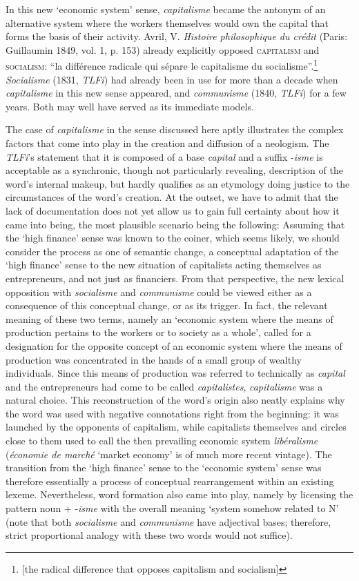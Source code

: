 \documentclass[output=paper]{langsci/langscibook}
\begin{document}
In this new `economic system' sense, \emph{capitalisme} became the
antonym of an alternative system where the workers themselves would own
the capital that forms the basis of their activity. Avril, V.
\emph{Histoire philosophique du crédit} (Paris: Guillaumin 1849, vol.
1, p. 153) already explicitly opposed \textsc{capitalism} and
\textsc{socialism}: ``la différence radicale qui sépare le capitalisme du
socialisme''.\footnote{{[}the radical difference that opposes capitalism
  and socialism{]}} \emph{Socialisme} (1831, \emph{TLFi}) had already
been in use for more than a decade when \emph{capitalisme} in this new
sense appeared, and \emph{communisme} (1840, \emph{TLFi}) for a few
years. Both may well have served as its immediate models.

The case of \emph{capitalisme} in the sense discussed here aptly
illustrates the complex factors that come into play in the creation and
diffusion of a neologism. The \emph{TLFi}'s statement that it is
composed of a base \emph{capital} and a suffix -\emph{isme} is
acceptable as a synchronic, though not particularly revealing,
description of the word's internal makeup, but hardly qualifies as an
etymology doing justice to the circumstances of the word's creation. At
the outset, we have to admit that the lack of documentation does not yet
allow us to gain full certainty about how it came into being, the most
plausible scenario being the following: Assuming that the `high
finance' sense was known to the coiner, which seems likely, we should
consider the process as one of semantic change, a conceptual adaptation
of the `high finance' sense to the new situation of capitalists acting
themselves as entrepreneurs, and not just as financiers. From that
perspective, the new lexical opposition with \emph{socialisme} and
\emph{communisme} could be viewed either as a consequence of this
conceptual change, or as its trigger. In fact, the relevant meaning of
these two terms, namely an `economic system where the means of production
pertains to the workers or to society as a whole', called for a
designation for the opposite concept of an economic system where the
means of production was concentrated in the hands of a small group of
wealthy individuals. Since this means of production was referred to
technically as \emph{capital} and the entrepreneurs had come to be
called \emph{capitalistes}, \emph{capitalisme} was a natural choice.
This reconstruction of the word's origin also neatly explains why the
word was used with negative connotations right from the beginning: it
was launched by the opponents of capitalism, while capitalists
themselves and circles close to them used to call the then prevailing
economic system \emph{libéralisme} (\emph{économie de marché} `market
economy' is of much more recent vintage). The transition from the `high
finance' sense to the `economic system' sense was therefore essentially
a process of conceptual rearrangement within an existing lexeme.
Nevertheless, word formation also came into play, namely by licensing the
pattern noun + -\emph{isme} with the overall meaning `system somehow
related to N' (note that both \emph{socialisme} and \emph{communisme}
have adjectival bases; therefore, strict proportional analogy with these two words
 would not suffice).
\end{document}

